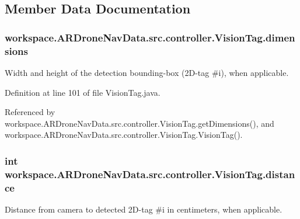 \subsection{Member Data Documentation}
\hypertarget{classworkspace_1_1_a_r_drone_nav_data_1_1src_1_1controller_1_1_vision_tag_a01330a161224d9cefa7598f66a682ee5}{}
\subsubsection[{dimensions}]{ workspace.\+A\+R\+Drone\+Nav\+Data.\+src.\+controller.\+Vision\+Tag.\+dimensions\hspace{0.3cm}{\ttfamily [private]}}\label{classworkspace_1_1_a_r_drone_nav_data_1_1src_1_1controller_1_1_vision_tag_a01330a161224d9cefa7598f66a682ee5}
Width and height of the detection bounding-\/box (2\+D-\/tag \#i), when applicable. 

Definition at line 101 of file Vision\+Tag.\+java.



Referenced by workspace.\+A\+R\+Drone\+Nav\+Data.\+src.\+controller.\+Vision\+Tag.\+get\+Dimensions(), and workspace.\+A\+R\+Drone\+Nav\+Data.\+src.\+controller.\+Vision\+Tag.\+Vision\+Tag().

\hypertarget{classworkspace_1_1_a_r_drone_nav_data_1_1src_1_1controller_1_1_vision_tag_a63eb0f5f6caa5bb491fa86a55e50a5e9}{}
\subsubsection[{distance}]{\setlength{\rightskip}{0pt plus 5cm}int workspace.\+A\+R\+Drone\+Nav\+Data.\+src.\+controller.\+Vision\+Tag.\+distance\hspace{0.3cm}{\ttfamily [private]}}\label{classworkspace_1_1_a_r_drone_nav_data_1_1src_1_1controller_1_1_vision_tag_a63eb0f5f6caa5bb491fa86a55e50a5e9}
Distance from camera to detected 2\+D-\/tag \#i in centimeters, when applicable. 

